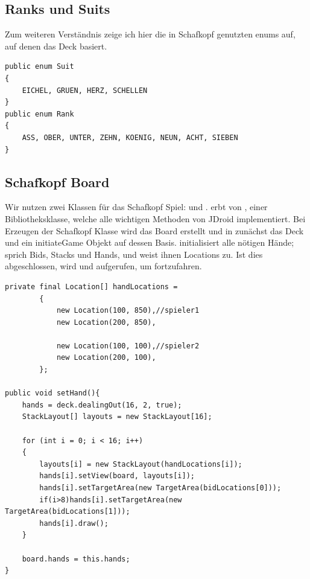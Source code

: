 \subsection{Ranks und Suits}

Zum weiteren Verständnis zeige ich hier die in Schafkopf genutzten enums auf,
auf denen das Deck basiert.

\begin{lstlisting}[caption={Enums für Kartenwertigkeiten},captionpos=b]
public enum Suit
{
    EICHEL, GRUEN, HERZ, SCHELLEN
}
public enum Rank
{
    ASS, OBER, UNTER, ZEHN, KOENIG, NEUN, ACHT, SIEBEN
}
\end{lstlisting}

\subsection{Schafkopf Board}

Wir nutzen zwei Klassen für das Schafkopf Spiel:  und
.  erbt von , einer
Bibliotheksklasse, welche alle wichtigen Methoden von JDroid implementiert. Bei
Erzeugen der Schafkopf Klasse wird das Board erstellt und in 
zunächst das Deck und ein initiateGame Objekt auf dessen Basis.
 initialisiert alle nötigen Hände; sprich Bids, Stacks und
Hands, und weist ihnen Locations zu. Ist dies abgeschlossen, wird
 und  aufgerufen, um fortzufahren.

\begin{lstlisting}[caption={Beispiel Hands initialisieren},captionpos=b]
private final Location[] handLocations =
        {
            new Location(100, 850),//spieler1
            new Location(200, 850),

            new Location(100, 100),//spieler2
            new Location(200, 100),
        };

public void setHand(){
    hands = deck.dealingOut(16, 2, true);
    StackLayout[] layouts = new StackLayout[16];

    for (int i = 0; i < 16; i++)
    {
        layouts[i] = new StackLayout(handLocations[i]);
        hands[i].setView(board, layouts[i]);
        hands[i].setTargetArea(new TargetArea(bidLocations[0]));
        if(i>8)hands[i].setTargetArea(new TargetArea(bidLocations[1]));
        hands[i].draw();
    }

    board.hands = this.hands;
}

\end{lstlisting}

